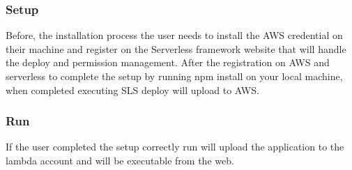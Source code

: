 \subsubsection{Setup}
Before, the installation process the user needs to install the AWS credential on their
machine and register on the Serverless framework website that will handle the deploy and permission
management. After the registration on AWS and serverless to complete the setup by running
npm install on your local machine, when completed executing SLS deploy will upload to AWS.
\subsubsection{Run}
If the user completed the setup correctly run  will upload the application to the lambda account and will be executable from the web.
